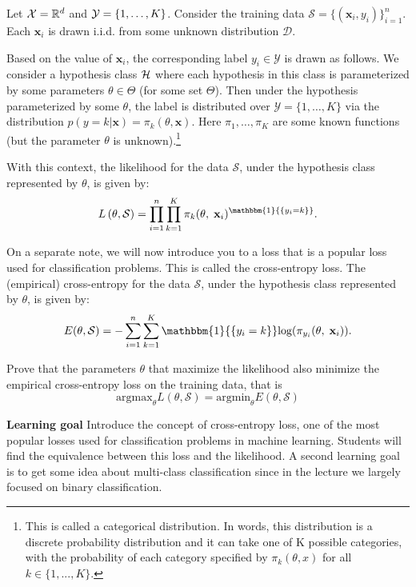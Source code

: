 \label{prb:final::prob1}

Let ${\cal X} = \mathbb{R}^{d}$ and ${\cal Y} = \{1,\dots,K\}$. Consider the 
training data $\mathcal{S} = \{ (\mathbf{x}_{i}, y_{i}) \}^{n}_{i=1}$. Each $\mathbf{x}_i$ is drawn i.i.d. from some unknown distribution $\mathcal{D}$. 


Based on the value of $\mathbf{x}_i$, the corresponding label $y_i \in \mathcal{Y}$ is drawn as follows. We consider a hypothesis class ${\cal H}$ where each hypothesis in this class is parameterized by some parameters $\theta \in \Theta$ (for some set $\Theta$). Then under the hypothesis parameterized by some $\theta$, the label is distributed over $\mathcal{Y} = \{1,\ldots,K\}$ via the distribution $p(y = k | \mathbf{x}) = \pi_k(\theta, \mathbf{x})$. Here $\pi_1,\ldots,\pi_K$ are some known functions (but the parameter $\theta$ is unknown).\footnote{This is called a categorical distribution. In words, this distribution is a discrete probability distribution and it can take one of K possible categories, with the probability of each category specified by $\pi_{k}(\theta, x)$ for all $k \in \{1,...,K\}$.}


With this context, the likelihood for the data $\mathcal{S}$, under the hypothesis class represented by $\theta$, is given by:
\begin{equation*}
\label{multinomial_maximum_likelihood_estimation}
L\left(\theta, \mathcal{S}\right) = \prod^{n}_{i=1} \prod^{K}_{k=1} \pi_{k}(\theta,\;\mathbf{x}_{i})^{\mathbbm{1}{\{y_{i}=k}\}} .
\end{equation*}

On a separate note, we will now introduce you to a loss that is a popular loss used for classification problems. This is called the cross-entropy loss. The (empirical) cross-entropy for the data $\mathcal{S}$, under the hypothesis class represented by $\theta$, is given by:
$$E(\theta, \mathcal{S}) = - \sum^{n}_{i=1} \sum^{K}_{k=1} \mathbbm{1}{\{y_{i}=k\}} \text{log}(\pi_{y_i}(\theta,\;\mathbf{x}_{i})).$$

 
Prove that the parameters $\theta$ that maximize the likelihood also minimize the empirical cross-entropy loss on the training data, that is
$$\text{argmax}_\theta L(\theta, \mathcal{S}) = \text{argmin}_\theta E(\theta, \mathcal{S})$$


\textbf{Learning goal} Introduce the concept of cross-entropy loss, one of the most popular losses used for classification problems in machine learning. Students will find the equivalence between this loss and the likelihood. A second learning goal is to get some idea about multi-class classification since in the lecture we largely focused on binary classification.